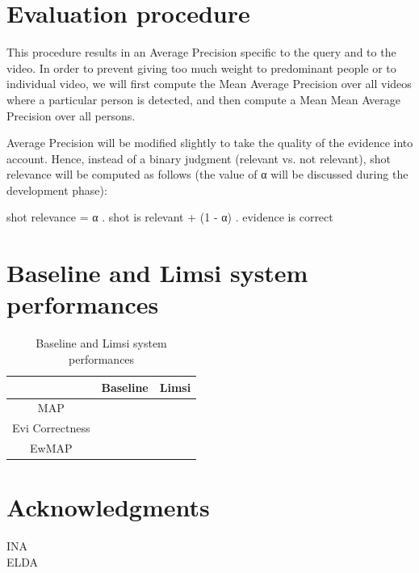 \documentclass{acm_proc_article-me}
\begin{document}
\section{Evaluation procedure}

This procedure results in an Average Precision specific to the query and to the video. In order to prevent giving too much weight to predominant people or to individual video, we will first compute the Mean Average Precision over all videos where a particular person is detected, and then compute a Mean Mean Average Precision over all persons.

Average Precision will be modified slightly to take the quality of the evidence into account. Hence, instead of a binary judgment (relevant vs. not relevant), shot relevance will be computed as follows (the value of α will be discussed during the development phase):

{shot relevance} = α . {shot is relevant} + (1 - α) . {evidence is correct}



\section{Baseline and Limsi system performances}

\begin{table}[ht]
  \centering
  \begin{tabular}{|c||c|c|}
    \hline
          			& Baseline & Limsi      \\
    \hline
    \hline    
    MAP				&		   &				\\
    Evi Correctness	&		   &				\\ 
    EwMAP			&		   &				\\
    \hline    
   \end{tabular}
  \caption{Baseline and Limsi system performances}
  \label{tab:perfs}
\end{table}



\section{Acknowledgments}

INA \\
ELDA \\



\end{document}
